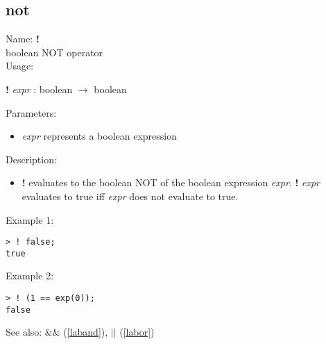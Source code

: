 \subsection{not}
\label{labnot}
\noindent Name: \textbf{!}\\
boolean NOT operator\\

\noindent Usage: 
\begin{center}
\textbf{!} \emph{expr} : \textsf{boolean} $\rightarrow$ \textsf{boolean}\\
\end{center}
Parameters: 
\begin{itemize}
\item \emph{expr} represents a boolean expression
\end{itemize}
\noindent Description: \begin{itemize}

\item \textbf{!} evaluates to the boolean NOT of the boolean expression
   \emph{expr}. \textbf{!} \emph{expr} evaluates to true iff \emph{expr} does not evaluate
   to true.
\end{itemize}
\noindent Example 1: 
\begin{center}\begin{minipage}{15cm}\begin{Verbatim}[frame=single]
> ! false;
true
\end{Verbatim}
\end{minipage}\end{center}
\noindent Example 2: 
\begin{center}\begin{minipage}{15cm}\begin{Verbatim}[frame=single]
> ! (1 == exp(0));
false
\end{Verbatim}
\end{minipage}\end{center}
See also: \textbf{$\&\&$} (\ref{laband}), \textbf{$||$} (\ref{labor})

